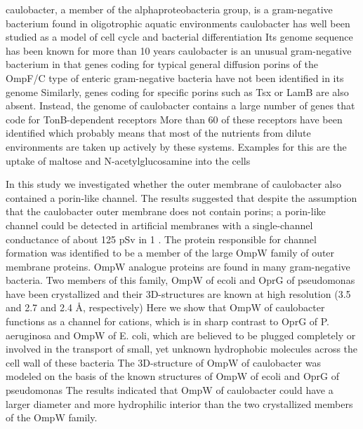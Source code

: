     \ac{caulobacter}, a member of the alphaproteobacteria group, is a gram-negative bacterium found in oligotrophic aquatic environments \ac{caulobacter} has well been studied as a model of cell cycle and bacterial differentiation Its genome sequence has been known for more than 10 years  \ac{caulobacter} is an unusual gram-negative bacterium in that genes coding for typical general diffusion porins of the OmpF/C type of enteric gram-negative bacteria have not been identified in its genome Similarly, genes coding for specific porins such as Tsx or LamB are also absent. Instead, the genome of \ac{caulobacter} contains a large number of genes that code for TonB-dependent receptors  More than 60 of these receptors have been identified which probably means that most of the nutrients from dilute environments are taken up actively by these systems. Examples for this are the uptake of maltose and N-acetylglucosamine into the cells

    In this study we investigated whether the outer membrane of \ac{caulobacter} also contained a porin-like channel. The results suggested that despite the assumption that the \ac{caulobacter} outer membrane does not contain porins; a porin-like channel could be detected in artificial membranes with a single-channel conductance of about 125 \si{\pico\sievert} in 1 \si{\molar} . The protein responsible for channel formation was identified to be a member of the large OmpW family of outer membrane proteins. OmpW analogue proteins are found in many gram-negative bacteria. Two members of this family, OmpW of \ac{ecoli} and OprG of \ac{pseudomonas} have been crystallized and their 3D-structures are known at high resolution (3.5 and 2.7 and 2.4 \AA, respectively)  Here we show that OmpW of \ac{caulobacter} functions as a channel for cations, which is in sharp contrast to OprG of P. aeruginosa and OmpW of E. coli, which are believed to be plugged completely or involved in the transport of small, yet unknown hydrophobic molecules across the cell wall of these bacteria  The 3D-structure of OmpW of \ac{caulobacter} was modeled on the basis of the known structures of OmpW of \ac{ecoli} and OprG of \ac{pseudomonas}  The results indicated that OmpW of \ac{caulobacter} could have a larger diameter and more hydrophilic interior than the two crystallized members of the OmpW family.

